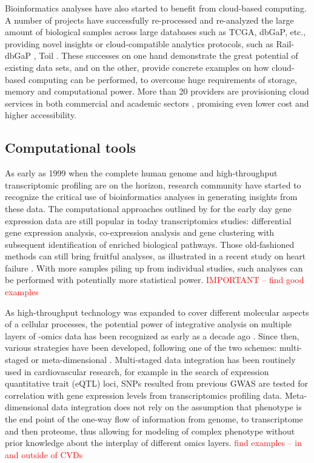 \documentclass[letter]{bioinfo}
\newcommand{\comment}[1]{\textcolor{red}{#1}}
\begin{document}
	Bioinformatics analyses have also started to benefit from cloud-based computing.
	A number of projects have successfully re-processed and re-analyzed the large amount of biological samples across large databases such as TCGA, dbGaP, etc., providing novel insights or cloud-compatible analytics protocols, such as Rail-dbGaP \citep{Nellore:2016:RaildbGaP}, Toil \citep{Vivian:2017:Toil}. These successes on one hand demonstrate the great potential of existing data sets, and on the other, provide concrete examples on how cloud-based computing can be performed, to overcome huge requirements of storage, memory and computational power. More than 20 providers are provisioning cloud services in both commercial and academic sectors \citep{Langmead:2018:Cloud}, promising even lower cost and higher accessibility.
	
	
	
	\subsection{Computational tools}
	
	As early as 1999 when the complete human genome and high-throughput transcriptomic profiling are on the horizon, research community have started to recognize the critical use of bioinformatics analyses in generating insights from these data. The computational approaches outlined by \cite{Claverie:1999:Computational} for the early day gene expression data are still popular in today transcriptomics studies: differential gene expression analysis, co-expression analysis and gene clustering with subsequent identification of enriched biological pathways. Those old-fashioned methods can still bring fruitful analyses, as illustrated in a recent study on heart failure \citep{Santolini:2018:personalized}. With more samples piling up from individual studies, such analyses can be performed with potentially more statistical power. \comment{IMPORTANT -- find good examples}
	
	As high-throughput technology was expanded to cover different molecular aspects of a cellular processes, the potential power of integrative analysis on multiple layers of -omics data has been recognized as early as a decade ago \citep{Hawkins:2010:Nextgeneration}. Since then, various strategies have been developed, following one of the two schemes: multi-staged or meta-dimensional \cite{Ritchie:2015:Methods}. Multi-staged data integration has been routinely used in cardiovascular research, for example in the search of expression quantitative trait (eQTL) loci, SNPs resulted from previous GWAS are tested for correlation with gene expression levels from transcriptomics profiling data. Meta-dimensional data integration does not rely on the assumption that phenotype is the end point of the one-way flow of information from genome, to transcriptome and then proteome, thus allowing for modeling of complex phenotype without prior knowledge about the interplay of different omics layers.
	\comment{find examples -- in and outside of CVDs}
	
\end{document}
